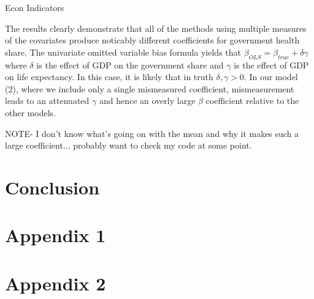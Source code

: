 \documentclass[12pt]{article}
\begin{document}
        

        \begin{table}[!htbp] \centering
            \caption{Econ Indicators \label{Econ_Indicators}}
            
        \end{table}

        The results clearly demonstrate that all of the methods using multiple measures of the covariates produce noticably different coefficients for government health share. The univariate omitted variable bias formula yields that $\beta_{OLS} = \beta_{true} + \delta\gamma$ where $\delta$ is the effect of GDP on the government share and $\gamma$ is the effect of GDP on life expectancy. In this case, it is likely that in truth $\delta, \gamma > 0$. In our model (2), where we include only a single mismeasured coefficient, mismeasurement leads to an attenuated $\gamma$ and hence an overly large $\beta$ coefficient relative to the other models.

        NOTE- I don't know what's going on with the mean and why it makes such a large coefficient... probably want to check my code at some point.


    \section*{Conclusion}

    \clearpage \newpage

    \appendix

    \section*{Appendix 1}

        
        
        
        
        
    \section*{Appendix 2}
\end{document}

